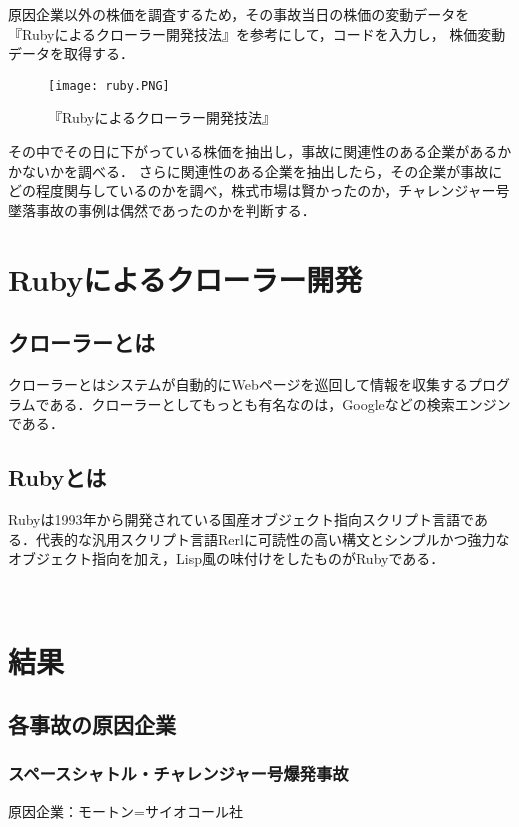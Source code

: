 原因企業以外の株価を調査するため，その事故当日の株価の変動データを『Rubyによるクローラー開発技法』を参考にして，コードを入力し，
株価変動データを取得する\cite{miyake}．

\begin{figure}[H]
\centering
\texttt{[image: ruby.PNG]}
\caption{『Rubyによるクローラー開発技法』}\label{サンプル図}
\end{figure}

その中でその日に下がっている株価を抽出し，事故に関連性のある企業があるかかないかを調べる．
さらに関連性のある企業を抽出したら，その企業が事故にどの程度関与しているのかを調べ，株式市場は賢かったのか，チャレンジャー号墜落事故の事例は偶然であったのかを判断する．



\chapter{Rubyによるクローラー開発}
\section{クローラーとは}
クローラーとはシステムが自動的にWebページを巡回して情報を収集するプログラムである．クローラーとしてもっとも有名なのは，Googleなどの検索エンジンである\cite{miyake}．

\section{Rubyとは}
Rubyは1993年から開発されている国産オブジェクト指向スクリプト言語である．代表的な汎用スクリプト言語Rerlに可読性の高い構文とシンプルかつ強力なオブジェクト指向を加え，Lisp風の味付けをしたものがRubyである\cite{miyake}．

　　　　　　　　　　　　　　　　　　　　　　　　　　　　　　　　　　　　　　　　　　　　　　　　　　　　　　　　　　　　　　　　　　　　　　　　　　　　　　　　　　　　　　　　　


\chapter{結果}
\section{各事故の原因企業}
\subsection{スペースシャトル・チャレンジャー号爆発事故}
原因企業：モートン=サイオコール社

